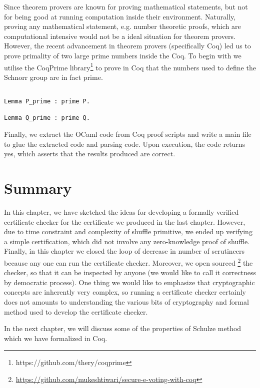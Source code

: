 Since theorem provers are known for proving mathematical statements, but not for being good at running 
computation inside their environment. Naturally, proving any mathematical statement, e.g. number 
theoretic proofs, which are computational intensive would not be a ideal situation for theorem provers. 
However, the recent advancement in theorem provers (specifically Coq) led
us to prove primality of two large prime numbers inside the Coq.
To begin with we utilise the CoqPrime
library\footnote{https://github.com/thery/coqprime} to prove in Coq that the
numbers used to define the Schnorr group are
in fact prime.
\begin{verbatim}

Lemma P_prime : prime P.

Lemma Q_prime : prime Q.

\end{verbatim}


Finally, we extract the OCaml code from Coq proof scripts and write a main file to glue the 
extracted code and parsing code. Upon execution, the code returns 
yes, which asserts that the results produced are correct. 


\section{Summary}
\label{sec:summary_software}
In this chapter, we have sketched the ideas for developing a formally verified certificate checker
for the certificate we produced in the last chapter. However, due to time constraint and 
complexity of shuffle primitive, 
we ended up verifying a simple certification, which did not involve any zero-knowledge proof 
of shuffle.  Finally, in this chapter we closed the loop of decrease in number of scrutineers because 
any one can run the certificate checker. Moreover, we open sourced 
\footnote{\url{https://github.com/mukeshtiwari/secure-e-voting-with-coq}} the checker, so 
that it can be inspected by anyone (we would like to call it correctness by democratic 
process).  One thing we would like to emphasize that cryptographic concepts are 
inherently very complex, so running a certificate checker certainly does not amounts 
to understanding the various bits of cryptography and formal method used to develop the
certificate checker.

In the next chapter, we will discuss some of the properties of Schulze method which we have 
formalized in Coq. 











































   
   
   
   
   
   